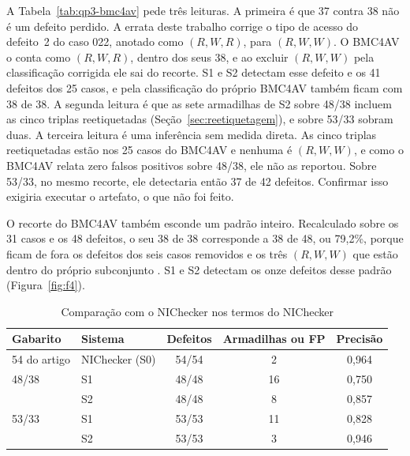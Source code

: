 A Tabela~\ref{tab:qp3-bmc4av} pede três leituras. A primeira é que 37 contra
38 não é um defeito perdido. A errata deste trabalho corrige o tipo de acesso
do defeito~2 do caso 022, anotado como $(R,W,R)$, para $(R,W,W)$. O BMC4AV o
conta como $(R,W,R)$, dentro dos seus 38, e ao excluir $(R,W,W)$ pela
classificação corrigida ele sai do recorte. S1 e S2 detectam esse defeito e os
41 defeitos dos 25 casos, e pela classificação do próprio BMC4AV também ficam
com 38 de 38. A segunda leitura é que as sete armadilhas de S2 sobre 48/38
incluem as cinco triplas reetiquetadas (Seção~\ref{sec:reetiquetagem}), e sobre
53/33 sobram duas. A terceira leitura é uma inferência sem medida direta. As cinco
triplas reetiquetadas estão nos 25 casos do BMC4AV e nenhuma é $(R,W,W)$, e
como o BMC4AV relata zero falsos positivos sobre 48/38, ele não as reportou.
Sobre 53/33, no mesmo recorte, ele detectaria então 37 de 42 defeitos.
Confirmar isso exigiria executar o artefato, o que não foi feito.

O recorte do BMC4AV também esconde um padrão inteiro. Recalculado sobre os 31
casos e os 48 defeitos, o seu 38 de 38 corresponde a 38 de 48, ou 79,2\%,
porque ficam de fora os defeitos dos seis casos removidos e os três
$(R,W,W)$ que estão dentro do próprio subconjunto \cite{bmc4av,racebench}. S1 e
S2 detectam os onze defeitos desse padrão (Figura~\ref{fig:f4}).

\begin{table}[htb]
  \centering
  \caption{Comparação com o NIChecker nos termos do NIChecker}
  \label{tab:qp3-nichecker}
  \begin{tabular}{|l|l|c|c|c|}
    \hline
    Gabarito & Sistema & Defeitos & Armadilhas ou FP & Precisão \\
    \hline
    54 do artigo & NIChecker (S0) & 54/54 & 2 & 0,964 \\
    \hline
    48/38 & S1 & 48/48 & 16 & 0,750 \\
    & S2 & 48/48 & 8 & 0,857 \\
    \hline
    53/33 & S1 & 53/53 & 11 & 0,828 \\
    & S2 & 53/53 & 3 & 0,946 \\
    \hline
  \end{tabular}
\end{table}

